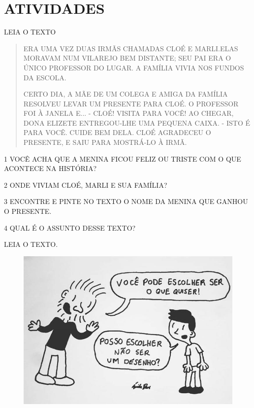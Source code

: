 
\section{ATIVIDADES}

LEIA O TEXTO


\begin{quote}
ERA UMA VEZ DUAS IRMÃS CHAMADAS CLOÉ E MARLI.ELAS MORAVAM NUM VILAREJO
BEM DISTANTE; SEU PAI ERA O ÚNICO PROFESSOR DO LUGAR. A FAMÍLIA VIVIA
NOS FUNDOS DA ESCOLA.

CERTO DIA, A MÃE DE UM COLEGA E AMIGA DA FAMÍLIA RESOLVEU LEVAR UM
PRESENTE PARA CLOÉ. O PROFESSOR FOI À JANELA E... - CLOÉ! VISITA PARA
VOCÊ! AO CHEGAR, DONA ELIZETE ENTREGOU-LHE UMA PEQUENA CAIXA. - ISTO É
PARA VOCÊ. CUIDE BEM DELA. CLOÉ AGRADECEU O PRESENTE, E SAIU PARA
MOSTRÁ-LO À IRMÃ.

\end{quote}

\num{1} VOCÊ ACHA QUE A MENINA FICOU FELIZ OU TRISTE COM O QUE ACONTECE NA HISTÓRIA?


\num{2} ONDE VIVIAM CLOÉ, MARLI E SUA FAMÍLIA?


\num{3} ENCONTRE E PINTE NO TEXTO O NOME DA MENINA QUE GANHOU O PRESENTE.

\num{4} QUAL É O ASSUNTO DESSE TEXTO?


LEIA O TEXTO.

\begin{figure}[htpb!]
\includegraphics[width=\textwidth]{media/image164.jpg}
\end{figure}

